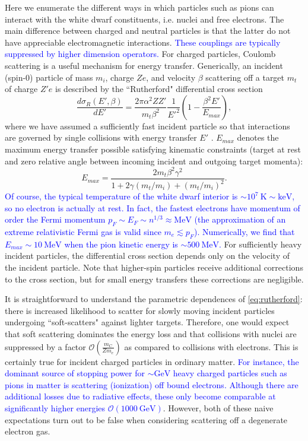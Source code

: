 \documentclass[11 pt, preprint,preprintnumbers,amsmath,amssymb, prd]{revtex4}
\newcommand{\OO}{\mathcal{O}}
\def\r{\right)}
\def\l{\left(}
\begin{document}
Here we enumerate the different ways in which particles such as pions can interact with the white dwarf constituents, i.e. nuclei and free electrons. The main difference between charged and neutral particles is that the latter do not have appreciable electromagnetic interactions. \textcolor{blue}{These couplings are typically suppressed by higher dimension operators.} For charged particles, Coulomb scattering is a useful mechanism for energy transfer. Generically, an incident (spin-0) particle of mass $m_i$, charge $Ze$, and velocity $\beta$ scattering off a target $m_t$ of charge $Z'e$ is described by the ``Rutherford" differential cross section
\begin{equation}
\label{eq:rutherford}
\frac{d \sigma_R (E', \beta)}{dE'} = \frac{2 \pi  \alpha^2 Z Z'}{m_t \beta^2} \frac{1}{E'^2} \l1- \frac{\beta^2 E'}{E_{max}}\r, 
 \end{equation}
where we have assumed a sufficiently fast incident particle so that interactions are governed by single collisions with energy transfer $E'$ \cite{Rossi}. $E_{max}$ denotes the maximum energy transfer possible satisfying kinematic constraints (target at rest and zero relative angle between incoming incident and outgoing target momenta):
\begin{equation}
E_{max} = \frac{2 m_t \beta^2 \gamma^2}{1+ 2\gamma(m_t/m_i) +(m_t/m_i)^2}. 
\end{equation}
\textcolor{blue}{Of course, the typical temperature of the white dwarf interior is $\sim 10^{7} ~\text{K} \sim \text{keV}$, so no electron is actually at rest. In fact, the fastest electrons have momentum of order the Fermi momentum $p_F \sim E_F \sim n^{1/3} \approx \text{MeV}$ (the approximation of an extreme relativistic Fermi gas is valid since $m_e \lesssim p_F$). Numerically, we find that $E_{max} \sim 10 ~\text{MeV}$ when the pion kinetic energy is $\sim 500 ~\text{MeV}$.} For sufficiently heavy incident particles, the differential cross section depends only on the velocity of the incident particle. Note that higher-spin particles receive additional corrections to the cross section, but for small energy transfers these corrections are negligible.

It is straightforward to understand the parametric dependences of \eqref{eq:rutherford}: there is increased likelihood to scatter for slowly moving incident particles undergoing ``soft-scatters" against lighter targets. Therefore, one would expect that soft scattering dominates the energy loss and that collisions with nuclei are suppressed by a factor $\OO\l\frac{m_C}{Z m_e}\r$ as compared to collisions with electrons. This is certainly true for incident charged particles in ordinary matter. \textcolor{blue}{For instance, the dominant source of stopping power for $\sim \text{GeV}$ heavy charged particles such as pions in matter is scattering (ionization) off bound electrons. Although there are additional losses due to radiative effects, these only become comparable at significantly higher energies $\OO(1000~\text{GeV})$}. However, both of these naive expectations turn out to be false when considering scattering off a degenerate electron gas. 
\end{document}
